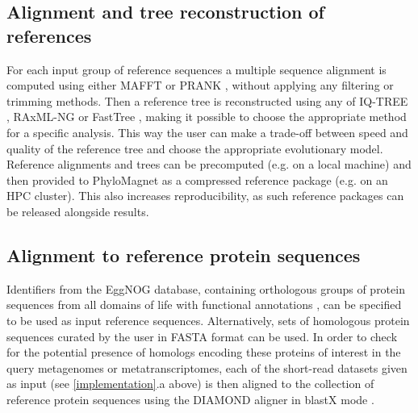 \documentclass[a4paper]{article}
\begin{document}
\subsection{Alignment and tree reconstruction of references}
For each input group of reference sequences a multiple sequence alignment is computed using either MAFFT \citep{Katoh2013} or PRANK \citep{Loytynoja2010}, without applying any filtering or trimming methods. Then a reference tree is reconstructed using any of IQ-TREE \citep{Nguyen2015}, RAxML-NG \citep{Stamatakis2014, Kozlov2019} or FastTree \citep{Price2010}, making it possible to choose the appropriate method for a specific analysis. This way the user can make a trade-off between speed and quality of the reference tree and choose the appropriate evolutionary model. Reference alignments and trees can be precomputed (e.g. on a local machine) and then provided to PhyloMagnet as a compressed reference package (e.g. on an HPC cluster). This also increases reproducibility, as such reference packages can be released alongside results.

\subsection{Alignment to reference protein sequences}
Identifiers from the EggNOG database, containing orthologous groups of protein sequences from all domains of life with functional annotations \citep{Huerta-cepas2016b}, can be specified to be used as input reference sequences. Alternatively, sets of homologous protein sequences curated by the user in FASTA format can be used. In order to check for the potential presence of homologs encoding these proteins of interest in the query metagenomes or metatranscriptomes, each of the short-read datasets given as input (see \ref{implementation}.a above) is then aligned to the collection of reference protein sequences using the DIAMOND aligner in blastX mode \citep[Fig. \ref{fig:01}:2;][]{Buchfink2014}.
\end{document}
